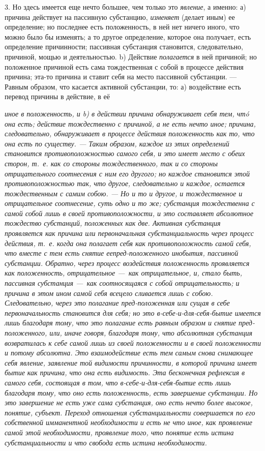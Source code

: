 \documentclass[twoside]{article}
\begin{document}
{3. Но здесь имеется еще нечто большее, чем только это {\em явление}, а именно:
а) причина действует на пассивную субстанцию, {\em изменяет} (делает
иным) ее определение; но последнее есть положенность, в ней нет ничего
иного, что можно было бы изменять; а то другое определение, которое она
получает, есть определение причинности; пассивная субстанция становится,
следовательно, причиной, мощью и деятельностью. b) Действие {\em полагается} 
в ней причиной; но положенное причиной есть сама тождественная с собой в 
процессе действия причина; эта-то причина и ставит себя на место пассивной
субстанции. — Равным образом, что касается активной субстанции, то: 
а) воздействие есть перевод причины в действие, в её {\em иное в
положенность, и b) в действии причина обнаруживает себя тем, чтó она есть;
действие тождественно с причиной, а не есть нечто иное; причина,
следовательно, обнаруживает в процессе действия положенность как то, что
она есть по существу. — Таким образом, каждое из этих
определений~\label{bkm:bm03} становится {\em противоположностью}
самого себя, и это имеет место с обеих сторон, т.~е. как со стороны 
тождественного, так и со стороны отрицательного {\em соотнесения с ним его 
другого}; но каждое становится этой противоположностью так, что другое, 
следовательно и каждое, остается {\em тождественным с самим собою}. — Но и 
то и другое, и тождественное и отрицательное соотнесение, суть одно и то же; 
субстанция тождественна с самой собой лишь в своей противоположности, и это 
составляет абсолютное тождество субстанций, положенных как две. Активная 
субстанция проявляется как причина или первоначальная субстанциальность 
через процесс действия, т.~е. когда она полагает себя как противоположность 
самой себя, что вместе с тем есть снятие ее{\em пред-положенного инобытия},
пассивной субстанции. Обратно, через процесс воздействия положенность 
проявляется {\em как} положенность, отрицательное —~{\em как} отрицательное,
и, стало быть, пассивная субстанция —~как {\em соотносящаяся с собой} 
отрицательность; и причина в этом ином самой себя всецело сливается лишь с 
собою. Следовательно, через это полагание {\em пред-положенная} или
{\em сущая в себе} первоначальность становится {\em для себя}; но это
в-себе-и-для-себя-бытие имеется лишь благодаря тому, что это полагание есть 
равным образом и {\em снятие} пред-положенного, или, иначе говоря, благодаря 
тому, что абсолютная субстанция возвратилась к себе самой лишь {\em из своей 
положенности} и {\em в своей положенности} и потому абсолютна. Это 
взаимодействие есть тем самым снова снимающее себя явление, заявление той
{\em видимости} причинности, в которой причина имеет бытие {\em как} причина,
{\em что она есть видимость}. Эта бесконечная рефлексия в самого себя, 
состоящая в том, что в-себе-и-для-себя-бытие есть лишь благодаря тому, что 
оно есть положенность, есть {\em завершение субстанции}. Но это завершение 
не есть уже сама {\em субстанция}, оно есть нечто более высокое, {\em понятие},
{\em субъект}. Переход отношения субстанциальности совершается по его 
собственной имманентной необходимости и есть не что иное, как проявление 
самой этой необходимости, проявление того, что понятие есть истина 
субстанциальности и что свобода есть истина необходимости.

}}
\end{document}
